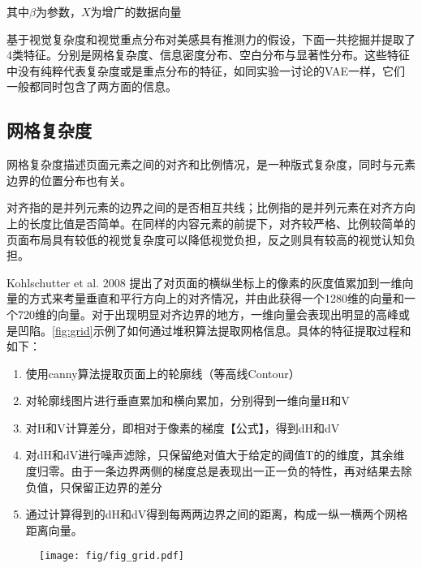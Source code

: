 其中$\beta$为参数，$X$为增广的数据向量

基于视觉复杂度和视觉重点分布对美感具有推测力的假设，下面一共挖掘并提取了4类特征。分别是网格复杂度、信息密度分布、空白分布与显著性分布。这些特征中没有纯粹代表复杂度或是重点分布的特征，如同实验一讨论的VAE一样，它们一般都同时包含了两方面的信息。

\subsection{网格复杂度}
网格复杂度描述页面元素之间的对齐和比例情况，是一种版式复杂度，同时与元素边界的位置分布也有关。

对齐指的是并列元素的边界之间的是否相互共线；比例指的是并列元素在对齐方向上的长度比值是否简单。在同样的内容元素的前提下，对齐较严格、比例较简单的页面布局具有较低的视觉复杂度可以降低视觉负担，反之则具有较高的视觉认知负担。

Kohlschutter et al. 2008 提出了对页面的横纵坐标上的像素的灰度值累加到一维向量的方式来考量垂直和平行方向上的对齐情况\cite{Kohlschutter2008}，并由此获得一个1280维的向量和一个720维的向量。对于出现明显对齐边界的地方，一维向量会表现出明显的高峰或是凹陷。\ref{fig:grid}示例了如何通过堆积算法提取网格信息。具体的特征提取过程和如下：
\begin{enumerate}
  \item 使用canny算法提取页面上的轮廓线（等高线Contour）
  \item 对轮廓线图片进行垂直累加和横向累加，分别得到一维向量H和V
  \item 对H和V计算差分，即相对于像素的梯度【公式】，得到dH和dV
  \item 对dH和dV进行噪声滤除，只保留绝对值大于给定的阈值T的的维度，其余维度归零。由于一条边界两侧的梯度总是表现出一正一负的特性，再对结果去除负值，只保留正边界的差分
  \item 通过计算得到的dH和dV得到每两两边界之间的距离，构成一纵一横两个网格距离向量。
\end{enumerate}

\begin{figure}[H]
  \centering
  \texttt{[image: fig/fig\_grid.pdf]}
\end{figure}

